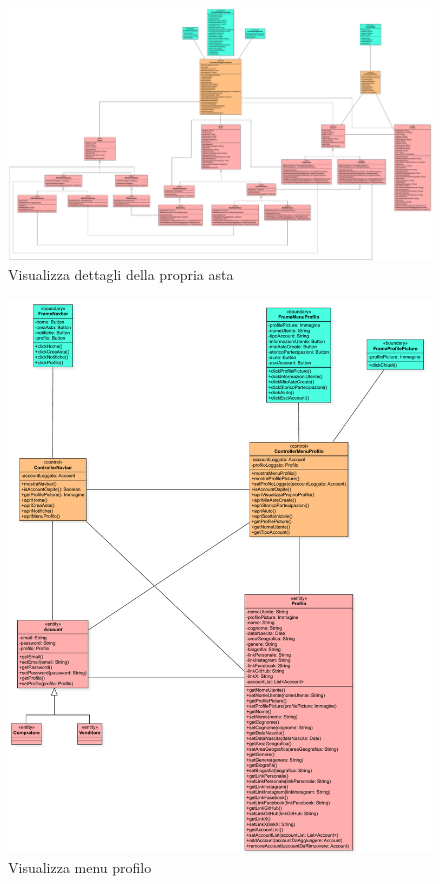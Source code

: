         \begin{figure}[htbp!]
            \centering
                \includegraphics[width=1\linewidth]{Immagini/Diagrammi/Class Diagram/Analisi/Utente che ha effettuato l'accesso/VisualizzaDettagliPropriaAsta.pdf}
            \caption{Visualizza dettagli della propria asta}
        \end{figure}
        
        \begin{figure}[htbp!]
            \centering
                \includegraphics[width=1\linewidth]{Immagini/Diagrammi/Class Diagram/Analisi/Utente che ha effettuato l'accesso/VisualizzaMenuProfilo.pdf}
            \caption{Visualizza menu profilo}
        \end{figure}
        
